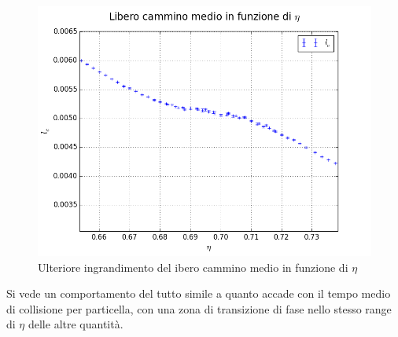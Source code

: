 \begin{figure}[h!]
	\centering
	\includegraphics[scale=0.48]{sfere2D/mfpzoomzoom.png}
	\caption{Ulteriore ingrandimento del ibero cammino medio in funzione di $\eta$}
	\end{figure}

Si vede un comportamento del tutto simile a quanto accade con il tempo medio di collisione per particella, con una zona di transizione di fase nello stesso range di $\eta$ delle altre quantità.


\newpage
